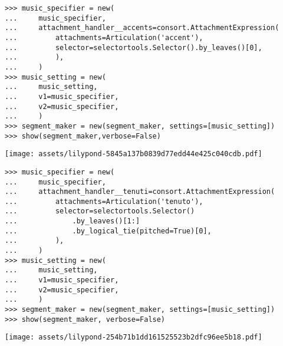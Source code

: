 \begin{comment}
<abjad>[stylesheet=../consort.ily]
music_specifier = new(
    music_specifier,
    attachment_handler__accents=consort.AttachmentExpression(
        attachments=Articulation('accent'),
        selector=selectortools.Selector().by_leaves()[0],
        ),
    )
music_setting = new(
    music_setting,
    v1=music_specifier,
    v2=music_specifier,
    )
segment_maker = new(segment_maker, settings=[music_setting])
show(segment_maker,verbose=False)
</abjad>
\end{comment}

\begin{singlespacing}
\vspace{-0.5\baselineskip}
\begin{lstlisting}
>>> music_specifier = new(
...     music_specifier,
...     attachment_handler__accents=consort.AttachmentExpression(
...         attachments=Articulation('accent'),
...         selector=selectortools.Selector().by_leaves()[0],
...         ),
...     )
>>> music_setting = new(
...     music_setting,
...     v1=music_specifier,
...     v2=music_specifier,
...     )
>>> segment_maker = new(segment_maker, settings=[music_setting])
>>> show(segment_maker,verbose=False)
\end{lstlisting}
\noindent\texttt{[image: assets/lilypond-5845a137b0839d77edd44e425c040cdb.pdf]}
\end{singlespacing}

\begin{comment}
<abjad>[stylesheet=../consort.ily]
music_specifier = new(
    music_specifier,
    attachment_handler__tenuti=consort.AttachmentExpression(
        attachments=Articulation('tenuto'),
        selector=selectortools.Selector()
            .by_leaves()[1:]
            .by_logical_tie(pitched=True)[0],
        ),
    )
music_setting = new(
    music_setting,
    v1=music_specifier,
    v2=music_specifier,
    )
segment_maker = new(segment_maker, settings=[music_setting])
show(segment_maker, verbose=False)
</abjad>
\end{comment}

\begin{singlespacing}
\vspace{-0.5\baselineskip}
\begin{lstlisting}
>>> music_specifier = new(
...     music_specifier,
...     attachment_handler__tenuti=consort.AttachmentExpression(
...         attachments=Articulation('tenuto'),
...         selector=selectortools.Selector()
...             .by_leaves()[1:]
...             .by_logical_tie(pitched=True)[0],
...         ),
...     )
>>> music_setting = new(
...     music_setting,
...     v1=music_specifier,
...     v2=music_specifier,
...     )
>>> segment_maker = new(segment_maker, settings=[music_setting])
>>> show(segment_maker, verbose=False)
\end{lstlisting}
\noindent\texttt{[image: assets/lilypond-254b71b1dd161525523b2dfc96ee5b18.pdf]}
\end{singlespacing}

